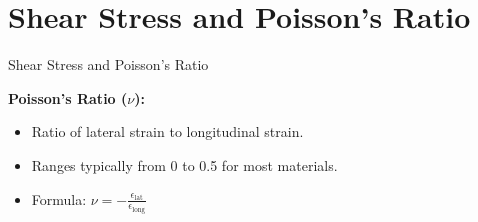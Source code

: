\documentclass{beamer}
\begin{document}
\section{Shear Stress and Poisson's Ratio}
\begin{frame}{Shear Stress and Poisson's Ratio}
    \begin{minipage}[t]{0.62\textwidth}
        \textbf{Poisson's Ratio ($\nu$):}
        \begin{itemize}
            \item Ratio of lateral strain to longitudinal strain.
            \item Ranges typically from 0 to 0.5 for most materials.
            \item Formula: $\nu = -\frac{\epsilon_{\text{lat}}}{\epsilon_{\text{long}}}$
        \end{itemize}
        

\end{minipage}
\end{frame}
\end{document}
